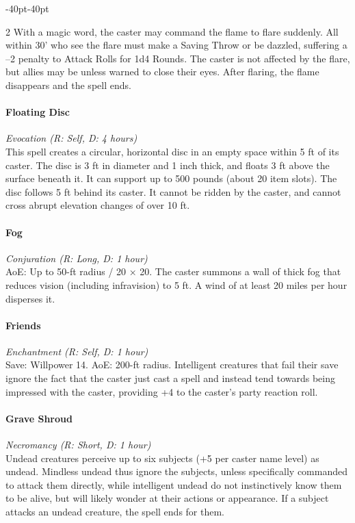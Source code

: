 \documentclass{book}
\begin{document}
\begin{adjustwidth}{-40pt}{-40pt}
\begin{multicols}{2}
With a magic word, the caster may command the flame to flare suddenly.
All within 30' who see the flare must make a Saving Throw or be dazzled,
suffering a --2 penalty to Attack Rolls for 1d4 Rounds. The caster is
not affected by the flare, but allies may be unless warned to close
their eyes. After flaring, the flame disappears and the spell ends.

\paragraph{Floating Disc}\label{floating-disc}
\emph{Evocation (R: Self, D: 4 hours)}\\
This spell creates a circular, horizontal disc in an empty space within
5 ft of its caster. The disc is 3 ft in diameter and 1 inch thick, and
floats 3 ft above the surface beneath it. It can support up to 500
pounds (about 20 item slots). The disc follows 5 ft behind its caster.
It cannot be ridden by the caster, and cannot cross abrupt elevation
changes of over 10 ft.

\paragraph{Fog}\label{fog}

\emph{Conjuration (R: Long, D: 1 hour)}\\
AoE: Up to 50-ft radius / 20 × 20. The caster summons a wall of thick
fog that reduces vision (including infravision) to 5 ft. A wind of at
least 20 miles per hour disperses it.

\paragraph{Friends}\label{friends}

\emph{Enchantment (R: Self, D: 1 hour)}\\
Save: Willpower 14. AoE: 200-ft radius. Intelligent creatures that fail
their save ignore the fact that the caster just cast a spell and instead
tend towards being impressed with the caster, providing +4 to the
caster's party reaction roll.

\paragraph{Grave Shroud}\label{grave-shroud}
\emph{Necromancy (R: Short, D: 1 hour)}\\
Undead creatures perceive up to six subjects (+5 per caster name level)
as undead. Mindless undead thus ignore the subjects, unless specifically
commanded to attack them directly, while intelligent undead do not
instinctively know them to be alive, but will likely wonder at their
actions or appearance. If a subject attacks an undead creature, the
spell ends for them.


\end{multicols}
\end{adjustwidth}
\end{document}
